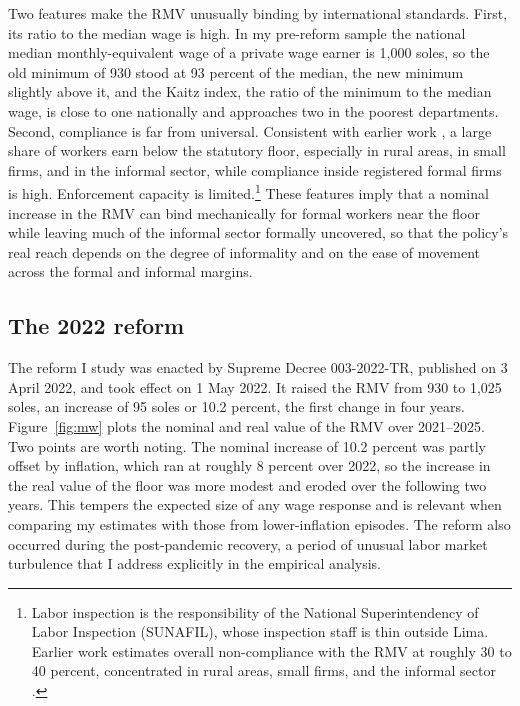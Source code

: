 Two features make the RMV unusually binding by international standards. First, its
ratio to the median wage is high. In my pre-reform sample the national median
monthly-equivalent wage of a private wage earner is 1,000 soles, so the old minimum of
930 stood at 93 percent of the median, the new minimum slightly above it, and the Kaitz
index, the ratio of the minimum to the median wage, is close to one nationally and
approaches two in the poorest departments. Second, compliance is far from universal. Consistent
with earlier work \citep{jaramillo_lopez_2006, cespedes_2005}, a large share of
workers earn below the statutory floor, especially in rural areas, in small firms,
and in the informal sector, while compliance inside registered formal firms is high.
Enforcement capacity is limited.\footnote{Labor inspection is the responsibility of the
National Superintendency of Labor Inspection (SUNAFIL), whose inspection staff is thin
outside Lima. Earlier work estimates overall non-compliance with the RMV at roughly 30 to
40 percent, concentrated in rural areas, small firms, and the informal sector
\citep{jaramillo_lopez_2006, cespedes_2005}.} These features imply that a nominal increase in the
RMV can bind mechanically for formal workers near the floor while leaving much of the
informal sector formally uncovered, so that the policy's real reach depends on the
degree of informality and on the ease of movement across the formal and informal
margins.

\subsection{The 2022 reform}

The reform I study was enacted by Supreme Decree 003-2022-TR, published on 3 April
2022, and took effect on 1 May 2022. It raised the RMV from 930
to 1,025 soles, an increase of 95 soles or 10.2 percent, the first change in four
years. Figure~\ref{fig:mw} plots the nominal and real value of the RMV over
2021--2025. Two points are worth noting. The nominal increase of 10.2 percent was
partly offset by inflation, which ran at roughly 8 percent over 2022, so the increase
in the real value of the floor was more modest and eroded over the following two
years. This tempers the expected size of any wage response and is relevant when
comparing my estimates with those from lower-inflation episodes. The reform also
occurred during the post-pandemic recovery, a period of unusual labor market
turbulence that I address explicitly in the empirical analysis.

